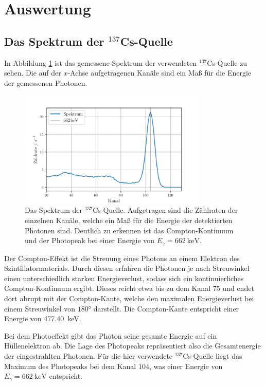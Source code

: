 \newpage
\section{Auswertung}
\label{sec:Auswertung}

\subsection{Das Spektrum der $^{137}$Cs-Quelle}
In Abbildung \ref{fig:tfig1} ist das gemessene Spektrum der verwendeten $^{137}$Cs-Quelle zu sehen.
Die auf der $x$-Achse aufgetragenen Kanäle sind ein Maß für die Energie der gemessenen Photonen.

\begin{figure}
\centering
\includegraphics[width=0.8\textwidth]{figures/Spektrum}
\caption{Das Spektrum der $^{137}$Cs-Quelle. Aufgetragen sind die Zählraten der einzelnen Kanäle, welche ein Maß für die Energie der detektierten Photonen sind.
Deutlich zu erkennen ist das Compton-Kontinuum und der Photopeak bei einer Energie von $E_\gamma = \SI{662}{\keV}$.}
\label{fig:tfig1}
\end{figure}

Der Compton-Effekt ist die Streuung eines Photons an einem Elektron des Szintillatormaterials.
Durch diesen erfahren die Photonen je nach Streuwinkel einen unterschiedlich starken Energieverlust, sodass sich ein kontinuierliches Compton-Kontinuum ergibt.
Dieses reicht etwa bis zu dem Kanal $75$ und endet dort abrupt mit der Compton-Kante, welche den maximalen Energieverlust bei einem Streuwinkel von $180°$ darstellt. 
Die Compton-Kante entspricht einer Energie von \SI{477.40}{\keV}.

Bei dem Photoeffekt gibt das Photon seine gesamte Energie auf ein Hüllenelektron ab.
Die Lage des Photopeaks repräsentiert also die Gesamtenergie der eingestrahlten Photonen.
Für die hier verwendete $^{137}$Cs-Quelle liegt das Maximum des Photopeaks bei dem Kanal $104$, was einer Energie von $E_\gamma = \SI{662}{\keV}$ entspricht.

